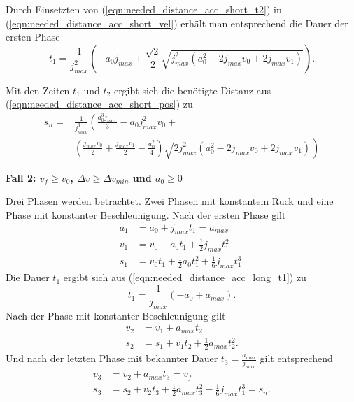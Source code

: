 Durch Einsetzten von (\ref{eqn:needed_distance_acc_short_t2}) in (\ref{eqn:needed_distance_acc_short_vel}) erhält man entsprechend die Dauer der ersten Phase
\begin{equation}
\label{eqn:needed_distance_acc_short_t1}
t_1 = \frac{1}{j_{{max}}^{2}} \left(- a_{0} j_{{max}} + \frac{\sqrt{2}}{2} \sqrt{j_{{max}}^{2} \left(a_{0}^{2} - 2 j_{{max}} v_{0} + 2 j_{{max}} v_{1}\right)}\right).
\end{equation}

Mit den Zeiten $t_1$ und $t_2$ ergibt sich die benötigte Distanz aus (\ref{eqn:needed_distance_acc_short_pos}) zu 
\begin{align}
\label{eqn:needed_distance_acc_short}
s_n =& \frac{1}{j_{max}^3} \left( \frac{a_0^3 j_{max}}{3} - a_{0} j_{{max}}^{2} v_{0} + \right. \nonumber \\
     & \left.\left(\frac{j_{{max}} v_{0}}{2} + \frac{j_{{max}} v_{1}}{2} - \frac{a_{0}^{2}}{4}\right) \sqrt{2j_{{max}}^{2} \left(a_{0}^{2} - 2 j_{{max}} v_{0} + 2 j_{{max}} v_{1}\right)}\right)
\end{align}

\textbf{Fall 2: $v_f \ge v_0$, $\Delta v \ge \Delta v_{min}$ und $a_0 \ge 0$}

Drei Phasen werden betrachtet. Zwei Phasen mit konstantem Ruck und eine Phase mit konstanter Beschleunigung.
Nach der ersten Phase gilt
\begin{align}
\label{eqn:needed_distance_acc_long_t1}
a_1 &= a_0 + j_{max}t_1 = a_{max} \\ 
v_1 &= v_0 + a_0t_1 + \frac{1}{2}j_{max}t_1^2 \\
s_1 &= v_0t_1 + \frac{1}{2}a_{0}t_1^2 + \frac{1}{6}j_{max}t_1^3.
\end{align}
Die Dauer $t_1$ ergibt sich aus (\ref{eqn:needed_distance_acc_long_t1}) zu 
\begin{equation}
t_1 = \frac{1}{j_{{max}}} \left(- a_{0} + a_{{max}}\right).
\end{equation}
Nach der Phase mit konstanter Beschleunigung gilt
\begin{align}
v_2 &= v_1 + a_{max}t_2 \\
s_2 &= s_1 + v_1t_2 + \frac{1}{2}a_{max}t_2^2.
\end{align}
Und nach der letzten Phase mit bekannter Dauer $t_3 = \frac{a_{max}}{j_{max}}$ gilt entsprechend
\begin{align}
\label{eqn:needed_distance_acc_long_vel}
v_3 &= v_2 + a_{max}t_3 = v_f\\
\label{eqn:needed_distance_acc_long_pos}
s_3 &= s_2 + v_2t_3 + \frac{1}{2}a_{max}t_3^2 - \frac{1}{6}j_{max}t_1^3 = s_n.
\end{align}

